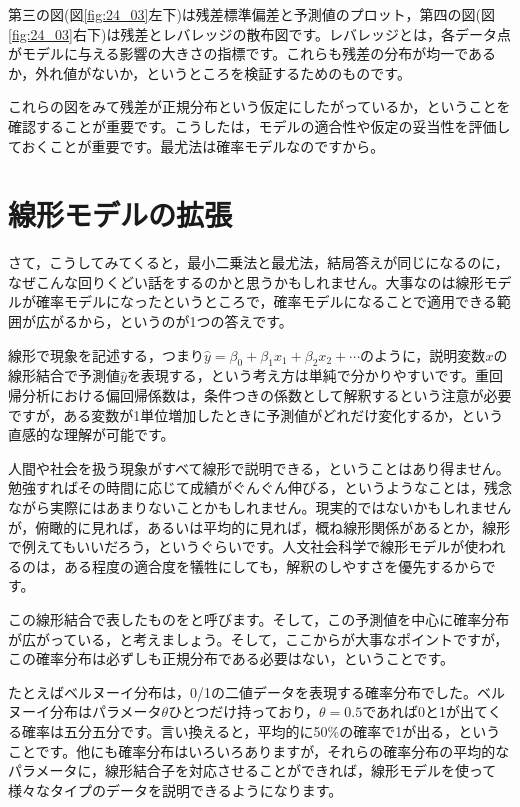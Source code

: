 \documentclass{ltjbook}
\begin{document}
第三の図(図\ref{fig:24_03}左下)は残差標準偏差と予測値のプロット，第四の図(図\ref{fig:24_03}右下)は残差とレバレッジの散布図です。レバレッジとは，各データ点がモデルに与える影響の大きさの指標です。これらも残差の分布が均一であるか，外れ値がないか，というところを検証するためのものです。

これらの図をみて残差が正規分布という仮定にしたがっているか，ということを確認することが重要です。こうしたは，モデルの適合性や仮定の妥当性を評価しておくことが重要です。最尤法は確率モデルなのですから。


\section{線形モデルの拡張}
さて，こうしてみてくると，最小二乗法と最尤法，結局答えが同じになるのに，なぜこんな回りくどい話をするのかと思うかもしれません。大事なのは線形モデルが確率モデルになったというところで，確率モデルになることで適用できる範囲が広がるから，というのが1つの答えです。

線形で現象を記述する，つまり$\hat{y} = \beta_0 + \beta_1 x_1 + \beta_2 x_2 + \cdots$のように，説明変数$x$の線形結合で予測値$\hat{y}$を表現する，という考え方は単純で分かりやすいです。重回帰分析における偏回帰係数は，条件つきの係数として解釈するという注意が必要ですが，ある変数が1単位増加したときに予測値がどれだけ変化するか，という直感的な理解が可能です。

人間や社会を扱う現象がすべて線形で説明できる，ということはあり得ません。勉強すればその時間に応じて成績がぐんぐん伸びる，というようなことは，残念ながら実際にはあまりないことかもしれません。現実的ではないかもしれませんが，俯瞰的に見れば，あるいは平均的に見れば，概ね線形関係があるとか，線形で例えてもいいだろう，というぐらいです。人文社会科学で線形モデルが使われるのは，ある程度の適合度を犠牲にしても，解釈のしやすさを優先するからです。

この線形結合で表したものをと呼びます。そして，この予測値を中心に確率分布が広がっている，と考えましょう。そして，ここからが大事なポイントですが，この確率分布は必ずしも正規分布である必要はない，ということです。

たとえばベルヌーイ分布は，0/1の二値データを表現する確率分布でした。ベルヌーイ分布はパラメータ$\theta$ひとつだけ持っており，$\theta=0.5$であれば0と1が出てくる確率は五分五分です。言い換えると，平均的に50\%の確率で1が出る，ということです。他にも確率分布はいろいろありますが，それらの確率分布の平均的なパラメータに，線形結合子を対応させることができれば，線形モデルを使って様々なタイプのデータを説明できるようになります。
\end{document}
